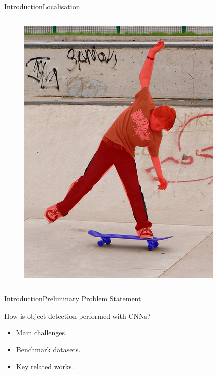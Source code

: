 \begin{frame}{Introduction}{Localisation}
\begin{columns}
\begin{figure}
            \includegraphics[width=1.0 \textwidth]{figs/objfieldssegmentation.png}
        \end{figure}
    \end{columns}
\end{frame}

\begin{frame}{Introduction}{Preliminary Problem Statement}
    \begin{block}{}
        How is object detection performed with CNNs?
        \begin{itemize}
            \item Main challenges.
            \item Benchmark datasets.
            \item Key related works.
        \end{itemize}
    \end{block}
\end{frame}